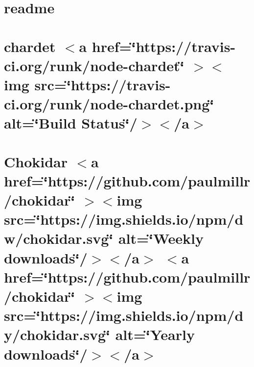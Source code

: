 \documentclass[twoside]{book}
\newcommand{\+}{\discretionary{\mbox{\scriptsize$\hookleftarrow$}}{}{}}
\begin{document}
\chapter{readme}
\label{md__c___users_vaishnavi_jadhav__desktop__developer_code_mean_stack_example_client_node_modules_chalk_readme}

\chapter{chardet \texorpdfstring{$<$}{<}a href=\char`\"{}https\+://travis-\/ci.\+org/runk/node-\/chardet\char`\"{} \texorpdfstring{$>$}{>}\texorpdfstring{$<$}{<}img src=\char`\"{}https\+://travis-\/ci.\+org/runk/node-\/chardet.\+png\char`\"{} alt=\char`\"{}\+Build Status\char`\"{}/\texorpdfstring{$>$}{>}\texorpdfstring{$<$}{<}/a\texorpdfstring{$>$}{>}}
\label{md__c___users_vaishnavi_jadhav__desktop__developer_code_mean_stack_example_client_node_modules_chardet__r_e_a_d_m_e}

\chapter{Chokidar \texorpdfstring{$<$}{<}a href=\char`\"{}https\+://github.\+com/paulmillr/chokidar\char`\"{} \texorpdfstring{$>$}{>}\texorpdfstring{$<$}{<}img src=\char`\"{}https\+://img.\+shields.\+io/npm/dw/chokidar.\+svg\char`\"{} alt=\char`\"{}\+Weekly downloads\char`\"{}/\texorpdfstring{$>$}{>}\texorpdfstring{$<$}{<}/a\texorpdfstring{$>$}{>} \texorpdfstring{$<$}{<}a href=\char`\"{}https\+://github.\+com/paulmillr/chokidar\char`\"{} \texorpdfstring{$>$}{>}\texorpdfstring{$<$}{<}img src=\char`\"{}https\+://img.\+shields.\+io/npm/dy/chokidar.\+svg\char`\"{} alt=\char`\"{}\+Yearly downloads\char`\"{}/\texorpdfstring{$>$}{>}\texorpdfstring{$<$}{<}/a\texorpdfstring{$>$}{>}}
\label{md__c___users_vaishnavi_jadhav__desktop__developer_code_mean_stack_example_client_node_modules_chokidar__r_e_a_d_m_e}

\end{document}
